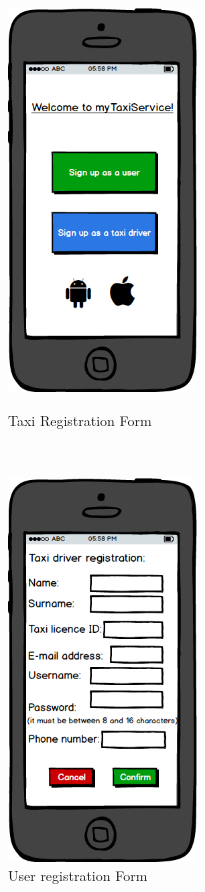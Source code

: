 \begin{figure}[H]
    \begin{minipage}[b]{6cm}
        \centering
        \includegraphics[width=5cm]{./Mockups/SignUp.png}
        \caption{Taxi Registration Form}
    \end{minipage}
    \ \hspace{2mm} \hspace{3mm} \
    \begin{minipage}[b]{6cm}
        \centering
        \includegraphics[width=5cm]{./Mockups/TaxiRegistration.png}
        \caption{User registration Form}
    \end{minipage}
\end{figure}

